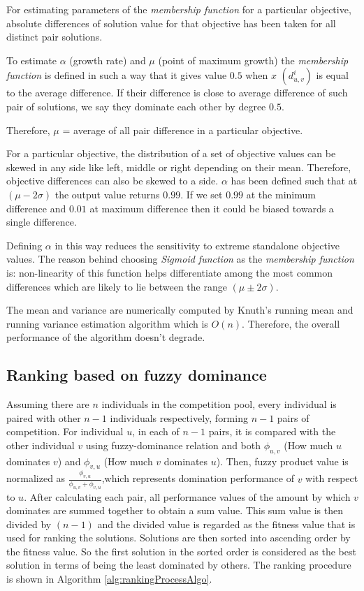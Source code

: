 \documentclass[journal]{IEEEtran}
\begin{document}
For estimating parameters of the \textit{membership function} for a particular objective, absolute differences of solution value for that objective has been taken for all distinct pair solutions. %

To estimate $\alpha$ (growth rate) and $\mu$ (point of maximum growth) the \textit{membership function} is defined in such a way that it gives value $0.5$ when $x$ $(d_{u,v}^i)$ is equal to the average difference. If their difference is close to average difference of such pair of solutions, we say they dominate each other by degree $0.5$.

Therefore, $\mu$ = average of all pair difference in a particular objective.

For a particular objective, the distribution of a set of objective values can be skewed in any side like left, middle or right depending on their mean. Therefore, objective differences can also be skewed to a side. $\alpha$ has been defined such that at $(\mu-2\sigma)$ the output value returns $0.99$. If we set $0.99$ at the minimum difference and $0.01$ at maximum difference then it could be biased towards a single difference.

Defining $\alpha$ in this way reduces the sensitivity to extreme standalone objective values. The reason behind choosing \textit{Sigmoid function} as the \textit{membership function} is: non-linearity of this function helps differentiate among the most common differences which are likely to lie between the range $(\mu \pm 2\sigma)$.

The mean and variance are numerically computed by Knuth's running mean and running variance estimation algorithm \cite{Knuth:1997:ACP:270146} which is $O(n)$. Therefore, the overall performance of the algorithm doesn't degrade.\\

\subsection{Ranking based on fuzzy dominance}
Assuming there are $n$ individuals in the competition pool, every individual is paired with other $n-1$ individuals respectively, forming $n-1$ pairs of competition. For individual $u$, in each of $n-1$ pairs, it is compared with the other individual $v$ using fuzzy-dominance relation and both $\phi_{u,v}$ (How much $u$ dominates $v$) and $\phi_{v,u}$ (How much $v$ dominates $u$). Then, fuzzy product value is normalized as $\frac{\phi_{v,u}}{\phi_{u,v}+\phi_{v,u}}$,which represents domination performance of $v$ with respect to $u$. After calculating each pair, all performance values of the amount by which $v$ dominates are summed together to obtain a sum value. This sum value is then divided by $(n-1)$ and the divided value is regarded as the fitness value that is used for ranking the solutions.
Solutions are then sorted into ascending order by the fitness value. So the first solution in the sorted order is considered as the best solution in terms of being the least dominated by others. The ranking procedure is shown in Algorithm \ref{alg:rankingProcessAlgo}.
\end{document}
